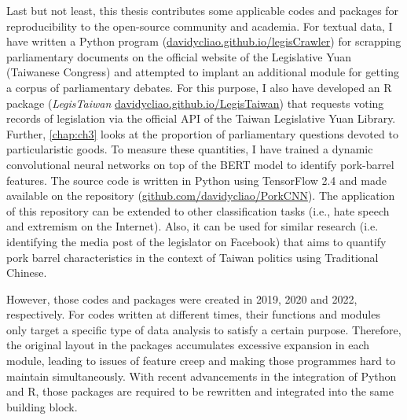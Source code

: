 Last but not least, this thesis contributes some applicable codes and packages for reproducibility to the open-source community and academia. For textual data, I have written a Python program (\href{https://davidycliao.github.io/legisCrawler}{davidycliao.github.io/legisCrawler}) for scrapping parliamentary documents on the official website of the Legislative Yuan (Taiwanese Congress) and attempted to implant an additional module for getting a corpus of parliamentary debates. For this purpose, I also have developed an R package (\textit{LegisTaiwan} \href{https://davidycliao.github.io/legisCrawler}{davidycliao.github.io/LegisTaiwan}) that requests voting records of legislation via the official API of the Taiwan Legislative Yuan Library. Further, \autoref{chap:ch3} looks at the proportion of parliamentary questions devoted to particularistic goods. To measure these quantities, I have trained a dynamic convolutional neural networks on top of the BERT model to identify pork-barrel features. The source code is written in Python using TensorFlow 2.4 and made available on the repository (\href{https://github.com/davidycliao/PorkCNN}{github.com/davidycliao/PorkCNN}). The application of this repository can be extended to other classification tasks (i.e., hate speech and extremism on the Internet). Also, it can be used for similar research (i.e. identifying the media post of the legislator on Facebook) that aims to quantify pork barrel characteristics in the context of Taiwan politics using Traditional Chinese. 

However, those codes and packages were created in 2019, 2020 and 2022, respectively. For codes written at different times, their functions and modules only target a specific type of data analysis to satisfy a certain purpose. Therefore, the original layout in the packages accumulates excessive expansion in each module, leading to issues of feature creep and making those programmes hard to maintain simultaneously. With recent advancements in the integration of Python and R, those packages are required to be rewritten and integrated into the same building block.
